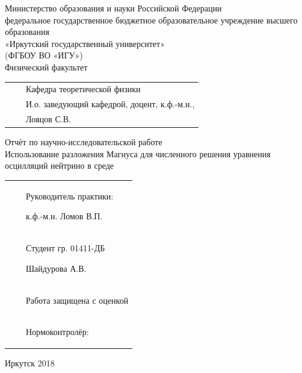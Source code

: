\documentclass[12pt]{article}
\begin{document}
\pagestyle{plain}
\thispagestyle{empty}

\large
\begin{titlepage}
  \begin{center}
    Министерство образования и науки Российской Федерации\\
    федеральное государственное бюджетное образовательное учреждение высшего
    образования
    \\
    «Иркутский государственный университет»\\
    (ФГБОУ ВО «ИГУ»)\\
    Физический факультет\\
  \end{center}
  \vspace*{34pt}

  \noindent
  \begin{tabular}{p{70mm}p{5mm}p{80mm}}
    && Кафедра теоретической физики\\
    && И.о. заведующий кафедрой, доцент, к.ф.-м.н., \\
    && Ловцов С.В. \underline{\hspace*{30mm}}\\
  \end{tabular}
  \vspace*{16pt}

  \begin{center}
    Отчёт по научно-исследовательской работе\\
    Использование разложения Магнуса для численного решения уравнения осцилляций
    нейтрино в среде
  \end{center}
  \vspace*{10pt}

  \noindent
  \begin{tabular}{p{70mm}p{5mm}p{80mm}}
    & & Руководитель практики:\par %
        \underline{\hspace*{30mm}}\hfill к.ф.-м.н. Ломов В.П.\\[12pt]
    & & Студент гр. 01411-ДБ \par %
        \underline{\hspace*{30mm}}\hfill Шайдурова А.В.\\[12pt]
    & & Работа защищена с оценкой \par%
        \underline{\hspace*{30mm}}\\[12pt]
    & & Нормоконтролёр: \par%
        \underline{\hspace*{30mm}}\quad\underline{\hspace*{30mm}}
  \end{tabular}

  \vfill
  \begin{center}
    Иркутск 2018
  \end{center}
\end{titlepage}
\end{document}
